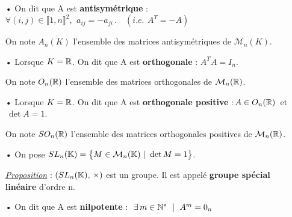 \begin{itemize}[leftmargin=0cm,rightmargin=0cm]
    \item[•] On dit que A est \textbf{antisymétrique} \ssi : \(\forall (i,j)\in \llbracket 1,n \rrbracket^2,\ \, a_{ij}=-a_{ji}\,.\quad (i.e.\ \, A^{T}=-A)\)\vspace{0.1cm}\\
    \begin{small}
        On note \(A_n(K)\) l'ensemble des matrices antisymétriques de \(\mathcal{M}_n(K)\).
    \end{small}\vspace{0.2cm}

    \item[•] Lorsque \(K=\mathbb{R}\). On dit que A est \textbf{orthogonale} \ssi : \(A^TA=I_n\).\vspace{0.1cm}\\
    \begin{small}
        On note \(O_n(\mathbb{R})\) l'ensemble des matrices orthogonales de \(\mathcal{M}_n(\mathbb{R})\).
    \end{small}\vspace{0.2cm}

    \item[•] Lorsque \(K=\mathbb{R}\). On dit que A est \textbf{orthogonale positive} \ssi :\(\,A\in O_n(\mathbb{R})\,\) et \(\,\det A=1\).\vspace{0.1cm}\\
    \begin{small}
        On note \(SO_n(\mathbb{R})\) l'ensemble des matrices orthogonales positives de \(\mathcal{M}_n(\mathbb{R})\).
    \end{small}\vspace{0.2cm}

    \item[•] On pose \(SL_n(\KK)=\bigl\{M\in \mathcal{M}_n(\KK) \ \rvert \ \det M=1 \bigr\}\).\vspace{0.1cm}\\
    \begin{small}
        \underline{\emph{Proposition}} : \((SL_n(\mathbb{K}),\,\times)\) est un groupe. Il est appelé \textbf{groupe spécial linéaire} d'ordre n.
    \end{small}\vspace{0.3cm}

    \item[•] On dit que A est \textbf{nilpotente} \ssi : \(\ \exists\, m\in \mathbb{N}^* \ \mid \ A^m=0_n\)\vspace{0.2cm}


\end{itemize}
